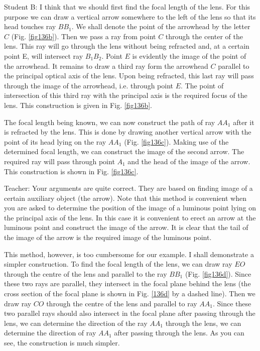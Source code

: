 \documentclass[a4paper,12pt]{book}
\begin{document}
{{\sc Student B:} I think that we should first find the focal length of the lens. For this purpose we can draw a vertical arrow somewhere to the left of the lens so that its head touches ray $BB_{1}$. We shall denote the point of the arrowhead by the letter $C$ (Fig. \ref{fig136b}). Then we pass a ray from point $C$ through the center of the lens. This ray will go through the lens without being refracted and, at a certain point E, will intersect ray $B_{1}B_{2}$. Point $E$ is evidently the image of the point of the arrowhead. It remains to draw a third ray form the arrowhead $C$ parallel to the principal optical axis of the lens. Upon being refracted, this last ray will pass through the image of the arrowhead, i.e. through point $E$. The point of intersection of this third ray with the principal axis is the required focus of the lens. This construction is given in Fig. \ref{fig136b}. 

The focal length being known, we can now construct the path of ray $AA_{1}$ after it is refracted by the lens. This is done by drawing another vertical arrow with the point of its head lying on the ray $AA_{1}$ (Fig. \ref{fig136c}). Making use of the determined focal length, we can construct the image of the second arrow. The required ray will pass through point $A_{1}$ and the head of the image of the arrow. This construction is shown in Fig. \ref{fig136c}.

{\sc Teacher:} Your arguments are quite correct. They are based on finding image of a certain auxiliary object (the arrow). Note that this method is convenient when you are asked to determine the position of the image of a luminous point lying on the principal axis of the lens. In this case it is convenient to erect an arrow at the luminous point and construct the image of the arrow. It is clear that the tail of the image of the arrow is the required image of the luminous point.

This method, however, is too cumbersome for our  example. I shall demonstrate a simpler construction. To find the focal length of the lens, we can draw ray $EO$ through the centre of the lens and parallel to the ray $BB_{1}$ (Fig. \ref{fig136d}). Since these two rays are parallel, they intersect in the focal plane behind the lens (the cross section of the focal plane is shown in Fig. \ref{136d} by a dashed line). Then we draw ray $CO$ through the centre of the lens and parallel to ray $AA_{1}$. Since these two parallel rays should also intersect in the focal plane after passing through the lens, we can determine the direction of the ray $AA_{1}$ through the lens, we can determine the direction of ray $AA_{1}$ after passing through the lens. As you can see, the construction is much simpler. 

}
\end{document}
